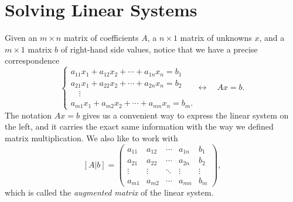 \section{Solving Linear Systems}
Given an $m \times n$ matrix of coefficients $A$, a
$n \times 1$ matrix of unknowns $x$, and a $m \times 1$
matrix $b$ of right-hand side values, notice that
we have a precise correspondence
\[
  \begin{cases}
    a_{11} x_1 + a_{12}x_2 + \cdots + a_{1n}x_n = b_1 \\
    a_{21} x_1 + a_{22}x_2 + \cdots + a_{2n}x_n = b_2 \\
    \quad \vdots \\
    a_{m1} x_1 + a_{m2}x_2 + \cdots + a_{mn}x_n = b_m.
  \end{cases}
  \longleftrightarrow \quad
  Ax = b.
\]
The notation $Ax = b$ gives us a convenient way to
express the linear system on the left, and it carries
the exact same information with the way we defined
matrix multiplication. We also like to work with
\[
  [A | b] =
  \left(
    \begin{array}{cccc|c}
      a_{11} & a_{12} & \cdots & a_{1n} & b_1 \\
      a_{21} & a_{22} & \cdots & a_{2n} & b_2 \\
      \vdots & \vdots & \ddots & \vdots & \vdots \\
      a_{m 1} & a_{m 2} & \cdots & a_{m n} & b_m
    \end{array}
  \right),
\]
which is called the \emph{augmented matrix} of the
linear system.
